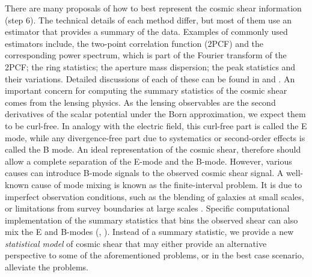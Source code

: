 There are many proposals of how to best represent the cosmic shear information
(step 6). The technical details of each method differ, but most of them use
an estimator that provides a summary of the data.
Examples of commonly used estimators include, the two-point correlation function 
(2PCF) and the corresponding power spectrum, which is part of the Fourier transform of the 2PCF; 
the ring statistics; the aperture mass dispersion; the peak statistics and
their variations. Detailed discussions of each of these can be found in 
\cite{Kilbinger2015} and \cite{Bartelmann2001a}.
An important concern for computing the summary statistics of the cosmic shear 
comes from the lensing physics. As the lensing observables are the second derivatives of the
scalar potential under the Born approximation, we expect them to be curl-free.
In analogy with the electric field, this curl-free part is called the E mode, 
while any divergence-free part due to systematics or second-order effects is called the 
B mode.
An ideal representation of the
cosmic shear, therefore should allow a complete separation of the E-mode and the B-mode.
However, various causes can
introduce B-mode signals to the observed cosmic shear signal. A well-known
cause of mode mixing is known as the finite-interval problem. It is due to
imperfect observation conditions, such as the blending of galaxies at small scales,
or limitations from survey boundaries at large scales \citep{Kilbinger2013}.  
Specific computational implementation of the summary statistics that bins the 
observed shear can also mix the E and B-modes 
(\citealt{Eifler2010},
\citealt{Becker2013}). Instead of a summary statistic, we provide a new 
{\it statistical model} of cosmic shear that may either provide an alternative
perspective to some of the aforementioned problems, or in the best case
scenario, alleviate the problems. 
 
